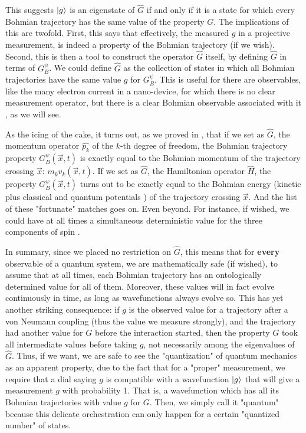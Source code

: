 \documentclass[11pt, a4paper]{article} %
\begin{document}
This suggests $\ket{g}$ is an eigenstate of $\hat{G}$ if and only if it is a state for which every Bohmian trajectory has the same value of the property $G$. The implications of this are twofold. First, this says that effectively, the measured $g$ in a projective measurement, is indeed a property of the Bohmian trajectory (if we wish). Second, this is then a tool to construct the operator $\hat{G}$ itself, by defining $\hat{G}$ in terms of $G^\psi_B$. We could define $\hat{G}$ as the collection of states in which all Bohmian trajectories have the same value $g$ for $G_B^\psi$. This is useful for there are observables, like the many electron current in a nano-device, for which there is no clear measurement operator, but there is a clear Bohmian observable associated with it \cite{Pel, equiv}, as we will see.

As the icing of the cake, it turns out, as we proved in \cite{DevInPosition1}, that if we set as $\hat{G}$, the momentum operator $\hat{p_k}$ of the $k$-th degree of freedom, the Bohmian trajectory property $G^\psi_B(\vec{x},t)$ is exactly equal to the Bohmian momentum of the trajectory crossing $\vec{x}$: $m_k v_k(\vec{x},t)$. If we set as $\hat{G}$, the Hamiltonian operator $\hat{H}$, the property $G^\psi_B(\vec{x},t)$ turns out to be exactly equal to the Bohmian energy (kinetic plus classical and quantum potentials \cite{JordiXavier}) of the trajectory crossing $\vec{x}$. And the list of these "fortunate" matches goes on. Even beyond. For instance, if wished, we could have at all times a simultaneous deterministic value for the three components of spin \cite{spin}.

In summary, since we placed no restriction on $\hat{G}$, this means that for {\bf every} observable of a quantum system, we are mathematically safe (if wished), to assume that at all times, each Bohmian trajectory has an ontologically determined value for all of them. Moreover, these values will in fact evolve continuously in time, as long as wavefunctions always evolve so. This has yet another striking consequence: if $g$ is the observed value for a trajectory after a von Neumann coupling (thus the value we measure strongly), and the trajectory had another value for $G$ before the interaction started, then the property $G$ took all intermediate values before taking $g$, not necessarily among the eigenvalues of $\hat{G}$. Thus, if we want, we are safe to see the "quantization" of quantum mechanics as an apparent property, due to the fact that for a "proper" measurement, we require that a dial saying $g$ is compatible with a wavefunction $\ket{g}$ that will give a measurement $g$ with probability 1. That is, a wavefunction which has all its Bohmian trajectories with value $g$ for $G$. Then, we simply call it "quantum" because this delicate orchestration can only happen for a certain "quantized number" of states.
\end{document}
